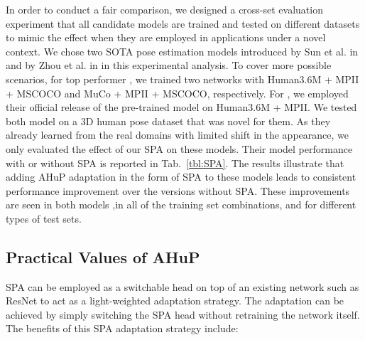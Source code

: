 \documentclass[twocolumn]{svjour3}          \smartqed  \usepackage{graphicx}
\newcommand{\tabref}[1]{Tab.~\ref{#1}}
\begin{document}
In order to conduct a fair comparison, we designed a cross-set evaluation experiment that all candidate models are trained and tested on different datasets to mimic the effect when they are employed in applications under a novel context.
We chose two SOTA pose estimation models introduced by Sun et al. in \cite{sun2018integral} and by Zhou et al. in \cite{zhou2017towards} in this experimental analysis. To cover more possible scenarios, for top performer \cite{sun2018integral}, we trained two networks with Human3.6M + MPII + MSCOCO  and  MuCo + MPII + MSCOCO, respectively.
For \cite{zhou2017towards}, we employed their official release of the pre-trained model on Human3.6M + MPII. 
We tested both model on a 3D human pose dataset that was novel for them. As they already learned from the real domains with limited shift in the appearance, we only evaluated the effect of our SPA on these models. 
Their model performance with or without SPA is reported in \tabref{tbl:SPA}. The results illustrate that adding AHuP adaptation in the form of SPA to these models leads to consistent performance improvement over the versions without SPA. These improvements are seen  in both models \cite{sun2018integral,zhou2017towards},in all of  the  training set combinations, and for different   types of  test sets.





\subsection{Practical Values of AHuP}
SPA can be employed as a switchable head on top of an existing network such as ResNet to act as a light-weighted adaptation strategy.
The adaptation can be achieved by simply switching the SPA head without retraining the network itself. The benefits of this SPA adaptation strategy include: 
\end{document}

